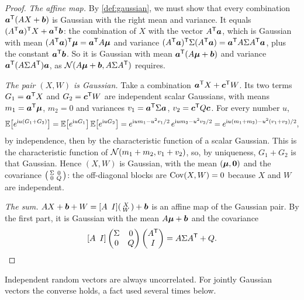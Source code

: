 \begin{proof}
\emph{The affine map.} By \cref{def:gaussian}, we must show that every
combination $\bm{a}^{\mathsf{T}}(AX+\bm{b})$ is Gaussian with the right mean and
variance. It equals $(A^{\mathsf{T}}\bm{a})^{\mathsf{T}} X+\bm{a}^{\mathsf{T}}\bm{b}$: the combination
of $X$ with the vector $A^{\mathsf{T}}\bm{a}$, which is Gaussian with mean
$(A^{\mathsf{T}}\bm{a})^{\mathsf{T}}\bm{\mu}=\bm{a}^{\mathsf{T}} A\bm{\mu}$ and variance $(A^{\mathsf{T}}\bm{a})^{\mathsf{T}}\Sigma
(A^{\mathsf{T}}\bm{a})=\bm{a}^{\mathsf{T}} A\Sigma A^{\mathsf{T}}\bm{a}$, plus the constant
$\bm{a}^{\mathsf{T}}\bm{b}$. So it is Gaussian with mean $\bm{a}^{\mathsf{T}}(A\bm{\mu}+\bm{b})$
and variance $\bm{a}^{\mathsf{T}}(A\Sigma A^{\mathsf{T}})\bm{a}$, as $\mathcal{N}(A\bm{\mu}+\bm{b},
A\Sigma A^{\mathsf{T}})$ requires.

\emph{The pair $(X,W)$ is Gaussian.} Take a combination $\bm{a}^{\mathsf{T}} X+\bm{c}^{\mathsf{T}} W$. Its two terms $G_1=\bm{a}^{\mathsf{T}} X$ and $G_2=\bm{c}^{\mathsf{T}} W$ are
independent scalar Gaussians, with means $m_1=\bm{a}^{\mathsf{T}}\bm{\mu}$, $m_2=0$ and
variances $v_1=\bm{a}^{\mathsf{T}}\Sigma\bm{a}$, $v_2=\bm{c}^{\mathsf{T}} Q\bm{c}$. For
every number $u$,
\[
  \mathbb{E}\bigl[e^{\mathrm{i} u(G_1+G_2)}\bigr]
  =\mathbb{E}\bigl[e^{\mathrm{i} uG_1}\bigr]\,\mathbb{E}\bigl[e^{\mathrm{i} uG_2}\bigr]
  =e^{\mathrm{i} um_1-u^2v_1/2}\,e^{\mathrm{i} um_2-u^2v_2/2}
  =e^{\mathrm{i} u(m_1+m_2)-u^2(v_1+v_2)/2},
\]
by independence, then by the characteristic function of a scalar
Gaussian. This is the characteristic function of
$\mathcal{N}(m_1+m_2,v_1+v_2)$, so, by uniqueness, $G_1+G_2$ is that
Gaussian. Hence $(X,W)$ is Gaussian, with the mean $(\bm{\mu},\bm{0})$ and the
covariance $\begin{psmallmatrix}\Sigma&0\\0&Q\end{psmallmatrix}$: the
off-diagonal blocks are $\operatorname{Cov}(X,W)=0$ because $X$ and $W$ are
independent.

\emph{The sum.} $AX+\vect b+W=[A\ \,I]\begin{psmallmatrix}X\\W
\end{psmallmatrix}+\vect b$ is an affine map of the Gaussian pair. By the
first part, it is Gaussian with the mean $A\bm{\mu}+\bm{b}$ and the covariance
\[
  [A\ \,I]\begin{pmatrix}\Sigma&0\\0&Q\end{pmatrix}
  \begin{pmatrix}A\T\\I\end{pmatrix}=A\Sigma A\T+Q .
\]
\end{proof}

Independent random vectors are always uncorrelated. For jointly Gaussian
vectors the converse holds, a fact used several times below.

